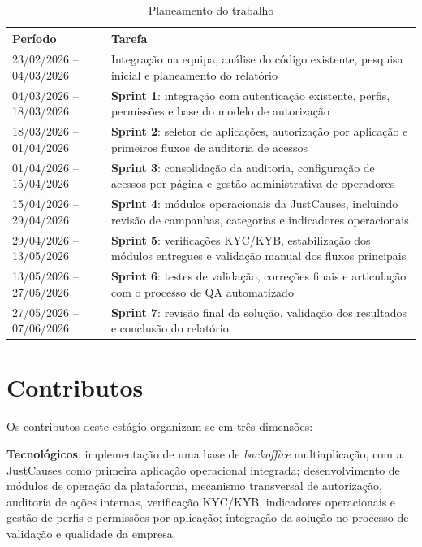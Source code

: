 \begin{table}[H]
\caption{Planeamento do trabalho}
\label{tab:planeamento}
\begin{center}
\begin{tabular}{|l|p{9cm}|}
\hline
\textbf{Período} & \textbf{Tarefa} \\ \hline
23/02/2026 -- 04/03/2026 & Integração na equipa, análise do código existente, pesquisa inicial e planeamento do relatório \\ \hline
04/03/2026 -- 18/03/2026 & \textbf{Sprint 1}: integração com autenticação existente, perfis, permissões e base do modelo de autorização \\ \hline
18/03/2026 -- 01/04/2026 & \textbf{Sprint 2}: seletor de aplicações, autorização por aplicação e primeiros fluxos de auditoria de acessos \\ \hline
01/04/2026 -- 15/04/2026 & \textbf{Sprint 3}: consolidação da auditoria, configuração de acessos por página e gestão administrativa de operadores \\ \hline
15/04/2026 -- 29/04/2026 & \textbf{Sprint 4}: módulos operacionais da JustCauses, incluindo revisão de campanhas, categorias e indicadores operacionais \\ \hline
29/04/2026 -- 13/05/2026 & \textbf{Sprint 5}: verificações KYC/KYB, estabilização dos módulos entregues e validação manual dos fluxos principais \\ \hline
13/05/2026 -- 27/05/2026 & \textbf{Sprint 6}: testes de validação, correções finais e articulação com o processo de \gls{QA} automatizado \\ \hline
27/05/2026 -- 07/06/2026 & \textbf{Sprint 7}: revisão final da solução, validação dos resultados e conclusão do relatório \\ \hline
\end{tabular}
\end{center}
\end{table}


\section{Contributos}

Os contributos deste estágio organizam-se em três dimensões:

\textbf{Tecnológicos}: implementação de uma base de \textit{backoffice} multiaplicação, com a JustCauses como primeira aplicação operacional integrada; desenvolvimento de módulos de operação da plataforma, mecanismo transversal de autorização, auditoria de ações internas, verificação \gls{KYC}/\gls{KYB}, indicadores operacionais e gestão de perfis e permissões por aplicação; integração da solução no processo de validação e qualidade da empresa.

